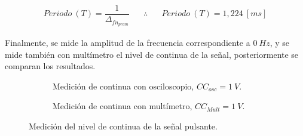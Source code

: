       \begin{align*}
        Periodo~\left( T \right)=\dfrac{1}{\Delta_{fn_{prom}}} \hspace{20pt} \therefore \hspace{20pt} \boxed{Periodo~\left( T \right)=1,224~[ms]}
      \end{align*}

      Finalmente, se mide la amplitud de la frecuencia correspondiente a $0~Hz$, y se mide 
      también con multímetro el nivel de continua de la señal, posteriormente se comparan 
      los resultados.

       \begin{figure}[H]
        \centering
        \begin{subfigure}[H]{0.48\textwidth}
          \caption{Medición de continua con osciloscopio, $CC_{osc}=1~V$.}
        \end{subfigure}
        \hfill
        \begin{subfigure}[H]{0.48\textwidth}
          \caption{Medición de continua con multímetro, $CC_{Mult}=1~V$.}
        \end{subfigure}

        \caption{Medición del nivel de continua de la señal pulsante.}
        \label{fig:Exp2SeñalPulsanteContinua}
      \end{figure}        
